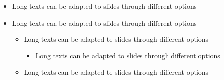 \documentclass[usepdftitle=false,professionalfonts,compress ]{beamer}
\begin{document}
{\begin{frame}[allowframebreaks]
\begin{itemize}
\begin{itemize}
			\item Long texts can be adapted to slides through different options
			\item Long texts can be adapted to slides through different options
			\begin{itemize}

				\item Long texts can be adapted to slides through different options
				\item Long texts can be adapted to slides through different options
				\item Long texts can be adapted to slides through different options
				\item Long texts can be adapted to slides through different options
			\end{itemize}
		\end{itemize}
		\item Long texts can be adapted to slides through different options
		\item Long texts can be adapted to slides through different options
		\begin{itemize}

			\item Long texts can be adapted to slides through different options
			\begin{itemize}

				\item Long texts can be adapted to slides through different options
			\end{itemize}
			\item Long texts can be adapted to slides through different options
		\end{itemize}
	\end{itemize}

\end{frame}
}
\end{document}
